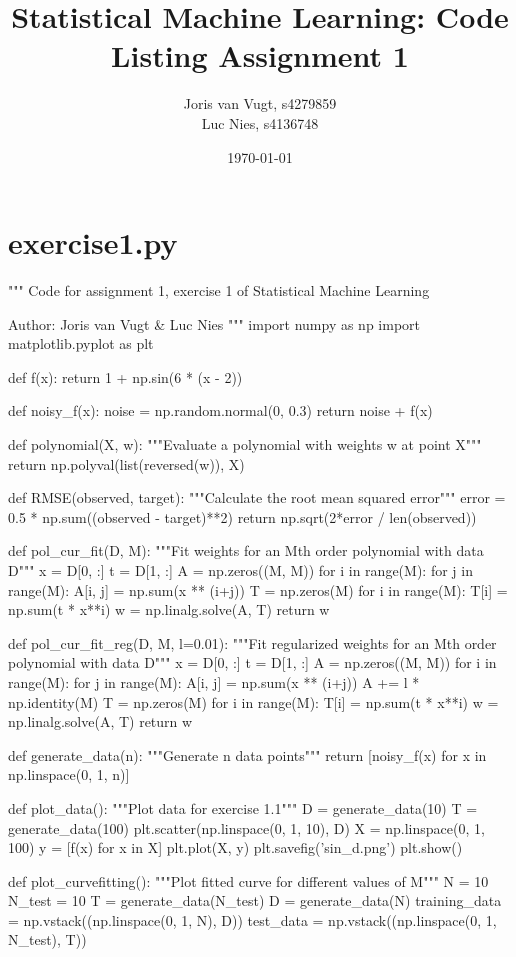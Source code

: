 \documentclass{article}
\title{Statistical Machine Learning: Code Listing Assignment 1}
\author{Joris van Vugt, s4279859 \\ Luc Nies, s4136748}
\date{\today}
\begin{document}
\maketitle
\section{exercise1.py}
\begin{python}
"""
Code for assignment 1, exercise 1 of Statistical Machine Learning

Author: Joris van Vugt & Luc Nies
"""
import numpy as np
import matplotlib.pyplot as plt


def f(x):
    return 1 + np.sin(6 * (x - 2))

def noisy_f(x):
    noise = np.random.normal(0, 0.3)
    return noise + f(x)

def polynomial(X, w):
    """Evaluate a polynomial with weights w at point X"""
    return np.polyval(list(reversed(w)), X)

def RMSE(observed, target):
    """Calculate the root mean squared error"""
    error = 0.5 * np.sum((observed - target)**2)
    return np.sqrt(2*error / len(observed))

def pol_cur_fit(D, M):
    """Fit weights for an Mth order polynomial with data D"""
    x = D[0, :]
    t = D[1, :]
    A = np.zeros((M, M))
    for i in range(M):
        for j in range(M):
            A[i, j] = np.sum(x ** (i+j))
    T = np.zeros(M)
    for i in range(M):
        T[i] = np.sum(t * x**i)
    w = np.linalg.solve(A, T)
    return w

def pol_cur_fit_reg(D, M, l=0.01):
    """Fit regularized weights for an Mth order polynomial with data D"""
    x = D[0, :]
    t = D[1, :]
    A = np.zeros((M, M))
    for i in range(M):
        for j in range(M):
            A[i, j] = np.sum(x ** (i+j))
    A += l * np.identity(M)
    T = np.zeros(M)
    for i in range(M):
        T[i] = np.sum(t * x**i)
    w = np.linalg.solve(A, T)
    return w

def generate_data(n):
    """Generate n data points"""
    return [noisy_f(x) for x in np.linspace(0, 1, n)]


def plot_data():
    """Plot data for exercise 1.1"""
    D = generate_data(10)
    T = generate_data(100)
    plt.scatter(np.linspace(0, 1, 10), D)
    X = np.linspace(0, 1, 100)
    y = [f(x) for x in X]
    plt.plot(X, y)
    plt.savefig('sin_d.png')
    plt.show()

def plot_curvefitting():
    """Plot fitted curve for different values of M"""
    N = 10
    N_test = 10
    T = generate_data(N_test)
    D = generate_data(N)
    training_data = np.vstack((np.linspace(0, 1, N), D))
    test_data = np.vstack((np.linspace(0, 1, N_test), T))


\end{python}
\end{document}
